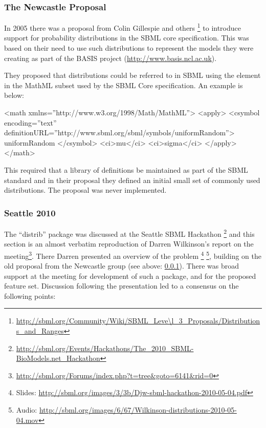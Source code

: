 \documentclass[draftspec]{sbmlpkgspec}
\newcommand{\mathml}{MathML\xspace}
\begin{document}
\subsubsection{The Newcastle Proposal}
\label{sec:newcastle proposal}

In 2005 there was a proposal from Colin Gillespie and others
\footnote{\url{http://sbml.org/Community/Wiki/SBML\_Leve\l_3\_Proposals/Distributions\_and\_Ranges}}
to introduce support for probability distributions in the SBML core specification. This
was based on their need to use such distributions to represent the
models they were creating as part of the BASIS project
(\url{http://www.basis.ncl.ac.uk}).

They proposed that distributions could be referred to in SBML using
the  element in the \mathml subset used by
the SBML Core specification. An example is below:

\begin{example}
<math xmlns=''http://www.w3.org/1998/Math/MathML''>
  <apply>
    <csymbol encoding=''text''
        definitionURL=''http://www.sbml.org/sbml/symbols/uniformRandom''>
      uniformRandom
    </csymbol>
    <ci>mu</ci>
    <ci>sigma</ci>
  </apply>
</math>
\end{example}

This required that a library of definitions be maintained as part of
the SBML standard and in their proposal they defined an initial small
set of commonly used distributions. The proposal was never
implemented.

\subsubsection{Seattle 2010}

The ``distrib'' package was discussed at the Seattle SBML Hackathon%
\footnote{\url{http://sbml.org/Events/Hackathons/The_2010_SBML-BioModels.net_Hackathon}}
and this section is an almost verbatim reproduction of Darren
Wilkinson's report on the
meeting\footnote{\url{http://sbml.org/Forums/index.php?t=tree\&goto=6141\&rid=0}}. There
Darren presented an overview of the problem%
\footnote{Slides: \url{http://sbml.org/images/3/3b/Djw-sbml-hackathon-2010-05-04.pdf}}%
\footnote{Audio: \url{http://sbml.org/images/6/67/Wilkinson-distributions-2010-05-04.mov}},
building on the old proposal from the Newcastle group (see above:
\ref{sec:newcastle proposal}).  There was broad support at the meeting
for development of such a package, and for the proposed feature
set. Discussion following the presentation led to a consensus on the
following points:
\end{document}
